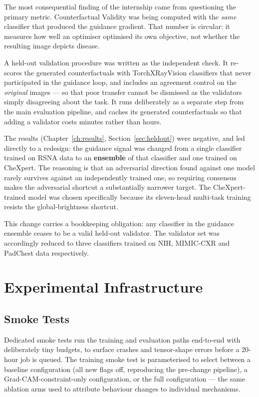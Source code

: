 The most consequential finding of the internship came from questioning
the primary metric. Counterfactual Validity was being computed with the
\emph{same} classifier that produced the guidance gradient. That number is
circular: it measures how well an optimiser optimised its own objective,
not whether the resulting image depicts disease.

A held-out validation procedure was written as the independent check. It
re-scores the generated counterfactuals with TorchXRayVision classifiers
that never participated in the guidance loop, and includes an agreement
control on the \emph{original} images --- so that poor transfer cannot be
dismissed as the validators simply disagreeing about the task. It runs
deliberately as a separate step from the main evaluation pipeline, and
caches its generated counterfactuals so that adding a validator costs
minutes rather than hours.

The results (Chapter~\ref{ch:results}, Section~\ref{sec:heldout}) were
negative, and led directly to a redesign: the guidance signal was changed
from a single classifier trained on RSNA data to an \textbf{ensemble} of
that classifier and one trained on CheXpert. The reasoning is that an
adversarial direction found against one model rarely survives against an
independently trained one, so requiring consensus makes the adversarial
shortcut a substantially narrower target. The CheXpert-trained model was
chosen specifically because its eleven-head multi-task training resists
the global-brightness shortcut.

This change carries a bookkeeping obligation: any classifier in the
guidance ensemble ceases to be a valid held-out validator. The validator
set was accordingly reduced to three classifiers trained on NIH, MIMIC-CXR
and PadChest data respectively.

\section{Experimental Infrastructure}

\subsection{Smoke Tests}

Dedicated smoke tests run the training and evaluation paths end-to-end
with deliberately tiny budgets, to surface crashes and tensor-shape
errors before a 20-hour job is queued. The training smoke test is
parameterised to select between a baseline configuration (all new flags
off, reproducing the pre-change pipeline), a Grad-CAM-constraint-only
configuration, or the full configuration --- the same ablation arms used
to attribute behaviour changes to individual mechanisms.

